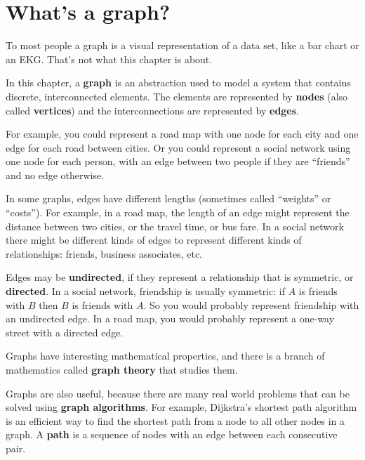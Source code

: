 \documentclass[10pt]{book}
\begin{document}
\section{What's a graph?}

To most people a graph is a visual representation of a data set, like
a bar chart or an EKG.  That's not what this chapter is about.

In this chapter, a {\bf graph} is an abstraction used to
model a system that contains discrete, interconnected elements.  The
elements are represented by {\bf nodes} (also called {\bf vertices})
and the interconnections are represented by {\bf edges}.

For example, you could represent a road map with one node for each
city and one edge for each road between cities.  Or you could
represent a social network using one node for each person, with an
edge between two people if they are ``friends'' and no edge otherwise.

In some graphs, edges have different lengths (sometimes
called ``weights'' or ``costs'').  For example, in a road map, the
length of an edge might represent the distance between
two cities, or the travel time, or bus fare.
In a social network there might be different kinds of
edges to represent different kinds of relationships: friends,
business associates, etc.

Edges may be {\bf undirected}, if they represent a relationship
that is symmetric, or {\bf directed}.  In a social network,
friendship is usually symmetric: if $A$ is friends with $B$ then
$B$ is friends with $A$.  So you would probably represent friendship
with an undirected edge.  In a road map, you would probably represent
a one-way street with a directed edge.

Graphs have interesting mathematical properties, and
there is a branch of mathematics called {\bf graph theory}
that studies them.

Graphs are also useful, because there are many real world
problems that can be solved using {\bf graph algorithms}.
For example, Dijkstra's shortest path algorithm is an efficient
way to find the shortest path from a node to all
other nodes in a graph.  A {\bf path} is a sequence of nodes
with an edge between each consecutive pair.
\end{document}
